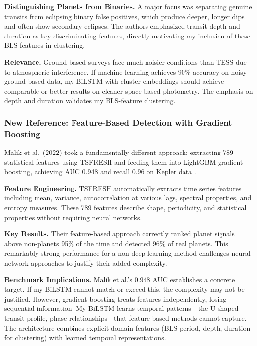 \documentclass[letterpaper]{article} %
\begin{document}
\textbf{Distinguishing Planets from Binaries.} A major focus was separating genuine transits from eclipsing binary false positives, which produce deeper, longer dips and often show secondary eclipses. The authors emphasized transit depth and duration as key discriminating features, directly motivating my inclusion of these BLS features in clustering.

\textbf{Relevance.} Ground-based surveys face much noisier conditions than TESS due to atmospheric interference. If machine learning achieves 90\% accuracy on noisy ground-based data, my BiLSTM with cluster embeddings should achieve comparable or better results on cleaner space-based photometry. The emphasis on depth and duration validates my BLS-feature clustering.

\subsubsection{New Reference: Feature-Based Detection with Gradient Boosting}

Malik et al.\ (2022) took a fundamentally different approach: extracting 789 statistical features using TSFRESH and feeding them into LightGBM gradient boosting, achieving AUC 0.948 and recall 0.96 on Kepler data \cite{Malik2022exoplanetdetection}.

\textbf{Feature Engineering.} TSFRESH automatically extracts time series features including mean, variance, autocorrelation at various lags, spectral properties, and entropy measures. These 789 features describe shape, periodicity, and statistical properties without requiring neural networks.

\textbf{Key Results.} Their feature-based approach correctly ranked planet signals above non-planets 95\% of the time and detected 96\% of real planets. This remarkably strong performance for a non-deep-learning method challenges neural network approaches to justify their added complexity.

\textbf{Benchmark Implications.} Malik et al.'s 0.948 AUC establishes a concrete target. If my BiLSTM cannot match or exceed this, the complexity may not be justified. However, gradient boosting treats features independently, losing sequential information. My BiLSTM learns temporal patterns---the U-shaped transit profile, phase relationships---that feature-based methods cannot capture. The architecture combines explicit domain features (BLS period, depth, duration for clustering) with learned temporal representations.
\end{document}
